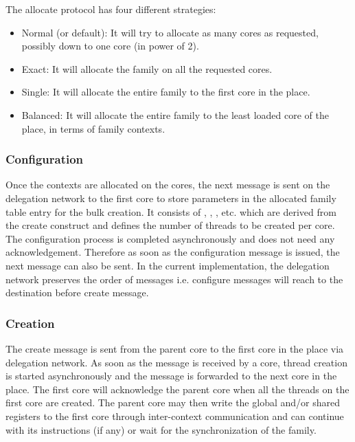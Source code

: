 \documentclass{article}
\begin{document}
The allocate protocol has four different strategies:

\begin{itemize}

\item Normal (or default): It will try to allocate as many cores as requested,
    possibly down to one core (in power of 2).

\item Exact: It will allocate the family on all the requested cores.

\item Single: It will allocate the entire family to the first core in the
    place.

\item Balanced: It will allocate the entire family to the least loaded core of
    the place, in terms of family contexts.

\end{itemize}

\subsubsection*{Configuration}

Once the contexts are allocated on the cores, the next message is sent on the
delegation network to the first core to store parameters in the allocated
family table entry for the bulk creation. It consists of ,
, ,  etc. which are derived from the create
construct and defines the number of threads to be created per core. The
configuration process is completed asynchronously and does not need any
acknowledgement. Therefore as soon as the configuration message is issued,
the next message can also be sent. In the current implementation, the
delegation network preserves the order of messages i.e. configure messages will
reach to the destination before create message.

\subsubsection*{Creation}

The create message is sent from the parent core to the first core in the place
via delegation network. As soon as the message is received by a core, thread
creation is started asynchronously and the message is forwarded to the next
core in the place. The first core will acknowledge the parent core when all the
threads on the first core are created. The parent core may then write the
global and/or shared registers to the first core through inter-context
communication and can continue with its instructions (if any) or wait for the
synchronization of the family.
\end{document}
